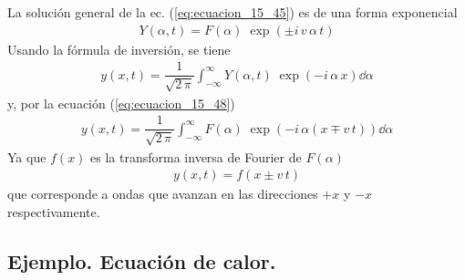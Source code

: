 La solución general de la ec. (\ref{eq:ecuacion_15_45}) es de una forma exponencial
\begin{align}
Y(\alpha, t) = F(\alpha) \; \exp(\pm  i \, v \, \alpha \, t)
\label{eq:ecuacion_15_48}
\end{align}
Usando la fórmula de inversión, se tiene
\begin{align}
y(x,t) = \dfrac{1}{\sqrt{2 \, \pi}} \int_{-\infty}^{\infty} Y(\alpha, t) \; \exp(-i \, \alpha \, x) \dd{\alpha}
\label{eq:ecuacion_15_49}
\end{align}
y, por la ecuación (\ref{eq:ecuacion_15_48})
\begin{align}
y(x, t) = \dfrac{1}{\sqrt{2 \, \pi}} \int_{-\infty}^{\infty} F(\alpha) \; \exp(- i \, \alpha (x \mp v \, t)) \dd{\alpha}
\label{eq:ecuacion_15_50}
\end{align}
Ya que $f(x)$ es la transforma inversa de Fourier de $F(\alpha)$
\begin{align}
y(x, t) = f (x \pm v \, t)
\label{eq:ecuacion_15_51}
\end{align}
que corresponde a ondas que avanzan en las direcciones $+x$ y $-x$ respectivamente.

\subsection*{Ejemplo. Ecuación de calor.}

